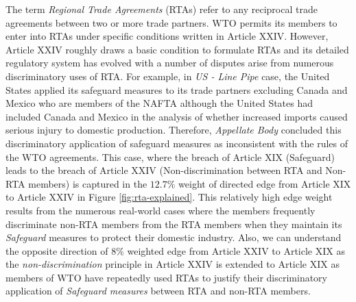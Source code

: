 The term \textit{Regional Trade Agreements} (RTAs)
refer to any reciprocal trade agreements between two or more trade partners.
WTO permits its members to enter into RTAs under specific conditions written in Article XXIV.
However, Article XXIV roughly draws a basic condition to formulate RTAs and its
detailed regulatory system has evolved with a number of disputes arise
from numerous discriminatory uses of RTA. For example,
in \textit{US - Line Pipe} case,
the United States applied its safeguard measures to its trade partners excluding Canada and Mexico who are members of the NAFTA although
the United States had included Canada and Mexico in the analysis of whether increased imports caused serious injury to domestic production.
Therefore, \textit{Appellate Body} concluded this discriminatory application of safeguard measures as inconsistent with the rules of the WTO agreements.
This case, where the breach of Article XIX (Safeguard) leads to the breach of Article XXIV (Non-discrimination between RTA and Non-RTA members)
is captured in the $12.7\%$ weight of directed edge from Article XIX to Article XXIV in Figure \ref{fig:rta-explained}.
This relatively high edge weight results from the numerous real-world cases where the members frequently discriminate non-RTA members from the RTA members when they maintain its \textit{Safeguard} measures to protect their domestic industry.
Also, we can understand the opposite direction of $8\%$ weighted edge from Article XXIV to Article XIX as the \textit{non-discrimination}
principle in Article XXIV is
extended to Article XIX as members of WTO have repeatedly used RTAs to justify their discriminatory application of \textit{Safeguard measures} between RTA and non-RTA members.%
 
